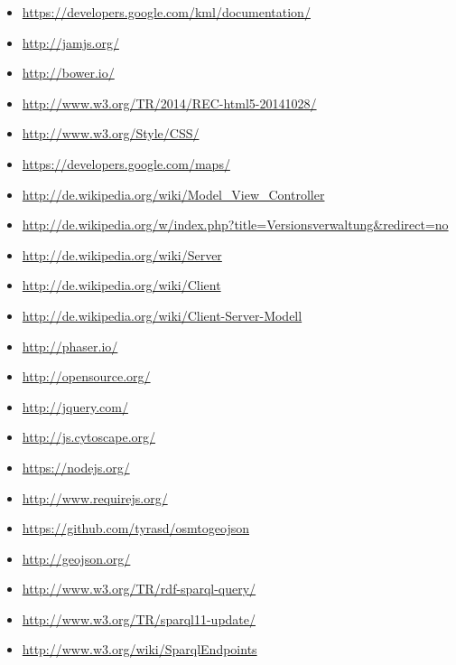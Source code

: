 \documentclass[11pt,a4paper]{article}
\begin{document}
\begin{itemize}
\item \url{https://developers.google.com/kml/documentation/}
\item \url{http://jamjs.org/}
\item \url{http://bower.io/}
\item \url{http://www.w3.org/TR/2014/REC-html5-20141028/}
\item \url{http://www.w3.org/Style/CSS/}
\item \url{https://developers.google.com/maps/}
\item \url{http://de.wikipedia.org/wiki/Model_View_Controller}
\item \url{http://de.wikipedia.org/w/index.php?title=Versionsverwaltung&redirect=no}
\item \url{http://de.wikipedia.org/wiki/Server}
\item \url{http://de.wikipedia.org/wiki/Client}
\item \url{http://de.wikipedia.org/wiki/Client-Server-Modell}
\item \url{http://phaser.io/}
\item \url{http://opensource.org/}
\item \url{http://jquery.com/}
\item \url{http://js.cytoscape.org/}
\item \url{https://nodejs.org/}
\item \url{http://www.requirejs.org/}
\item \url{https://github.com/tyrasd/osmtogeojson}
\item \url{http://geojson.org/}
\item \url{http://www.w3.org/TR/rdf-sparql-query/}
\item \url{http://www.w3.org/TR/sparql11-update/}
\item \url{http://www.w3.org/wiki/SparqlEndpoints}




\end{itemize}
\end{document}
